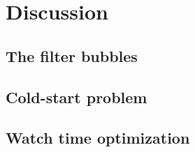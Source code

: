 \documentclass[../main.tex]{subfiles}
\begin{document}
\section{Discussion}

\subsection{The filter bubbles}

\subsection{Cold-start problem}

\subsection{Watch time optimization}
\end{document}
